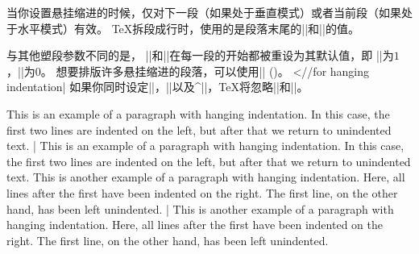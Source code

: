 当你设置悬挂缩进的时候，仅对下一段（如果处于垂直模式）或者当前段（如果处于水平模式）有效。
\TeX{}拆段成行时，使用的是段落末尾的|\hangafter|和|\hangindent|的值。
%


与其他塑段参数不同的是，
|\hangafter|和|\hangindent|在每一段的开始都被重设为其默认值，即
|\hangafter|为$1$，|\hangindent|为$0$。
想要排版许多悬挂缩进的段落，可以使用|\everypar| (\xref{\everypar})。
^^|\everypar//for hanging indentation|
如果你同时设定|\hangafter|，|\hangindent|以及^|\parshape|，\TeX{}将忽略|\hangafter|和|\hangindent|。

\example
\hangindent=6pc 
This is an example of a paragraph with hanging indentation.
In this case, the first two lines are indented on the left,
but after that we return to unindented text.
|
\produces
\hangindent=6pc 
This is an example of a paragraph with hanging indentation.
In this case, the first two lines are indented on the left,
but after that we return to unindented text.
\nextexample
\hangindent=-6pc 
This is another example of a paragraph with hanging
indentation.  Here, all lines after the first have been
indented on the right. The first line, on the other
hand, has been left unindented.
|
\produces
\hangindent=-6pc 
This is another example of a paragraph with hanging
indentation.  Here, all lines after the first have been
indented on the right. The first line, on the other
hand, has been left unindented.
\endexample
\enddesc

